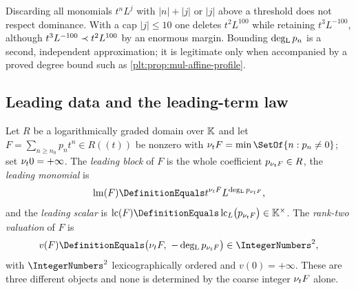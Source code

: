 \begin{remark}
\label{plt:rmk:mul-rectangular-cutoff}
Discarding all monomials $t^nL^j$ with $|n|+|j|$ or $|j|$ above a threshold
does not respect dominance.  With a cap $|j|\le10$ one deletes $t^2L^{100}$
while retaining $t^3L^{-100}$, although
$t^3L^{-100}\prec t^2L^{100}$ by an enormous margin.  Bounding
$\operatorname{deg_{L}} p_n$ is a second, independent approximation; it is legitimate only
when accompanied by a proved degree bound such as
\cref{plt:prop:mul-affine-profile}.
\end{remark}

\subsection{Leading data and the leading-term law}
\label{plt:sec:mul-leading}

\begin{definition}
\label{plt:def:mul-leading-data}
Let $R$ be a logarithmically graded domain over $\mathbb{K}$ and let
$F=\sum_{n\ge n_0}p_nt^n\in R((t))$ be nonzero with
$\ordt F=\min\SetOf{n:p_n\ne0}$; set $\nu_{t}0=+\infty$.  The
\emph{leading block} of $F$ is the whole coefficient $p_{\nu_{t} F}\in R$, the
\emph{leading monomial} is
\begin{equation}\label{plt:eq:mul-leading-monomial}
 \lm(F)\DefinitionEquals t^{\ordt F}L^{\degL p_{\ordt F}},
\end{equation}
and the \emph{leading scalar} is
$\lc(F)\DefinitionEquals\lc_L\bigl(p_{\ordt F}\bigr)\in\K^\times$.  The
\emph{rank-two valuation} of $F$ is
\begin{equation}\label{plt:eq:mul-rank-two}
 v(F)\DefinitionEquals\bigl(\ordt F,\ -\degL p_{\ordt F}\bigr)
 \in\IntegerNumbers^2,
\end{equation}
with $\IntegerNumbers^2$ lexicographically ordered and $v(0)=+\infty$.  These
are three different objects and none is determined by the coarse integer
$\nu_{t} F$ alone.
\end{definition}

